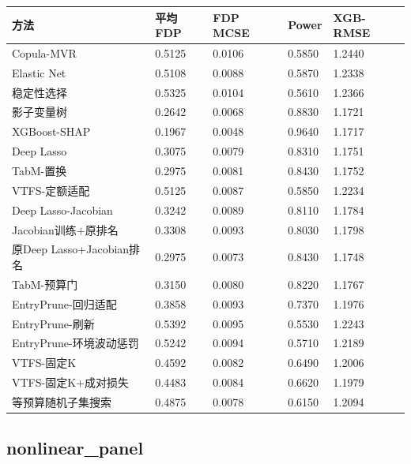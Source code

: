 \documentclass[UTF8,11pt,a4paper]{ctexart}
\begin{document}
{\def\LTcaptype{none} %
{
\footnotesize
\begin{longtable}[]{@{}lllll@{}}
\toprule\noalign{}
方法 & 平均FDP & FDP MCSE & Power & XGB-RMSE \\
\midrule\noalign{}
\endhead
\bottomrule\noalign{}
\endlastfoot
Copula-MVR & 0.5125 & 0.0106 & 0.5850 & 1.2440 \\
Elastic Net & 0.5108 & 0.0088 & 0.5870 & 1.2338 \\
稳定性选择 & 0.5325 & 0.0104 & 0.5610 & 1.2366 \\
影子变量树 & 0.2642 & 0.0068 & 0.8830 & 1.1721 \\
XGBoost-SHAP & 0.1967 & 0.0048 & 0.9640 & 1.1717 \\
Deep Lasso & 0.3075 & 0.0079 & 0.8310 & 1.1751 \\
TabM-置换 & 0.2975 & 0.0081 & 0.8430 & 1.1752 \\
VTFS-定额适配 & 0.5125 & 0.0087 & 0.5850 & 1.2234 \\
Deep Lasso-Jacobian & 0.3242 & 0.0089 & 0.8110 & 1.1784 \\
Jacobian训练+原排名 & 0.3308 & 0.0093 & 0.8030 & 1.1798 \\
原Deep Lasso+Jacobian排名 & 0.2975 & 0.0073 & 0.8430 & 1.1748 \\
TabM-预算门 & 0.3150 & 0.0080 & 0.8220 & 1.1767 \\
EntryPrune-回归适配 & 0.3858 & 0.0093 & 0.7370 & 1.1976 \\
EntryPrune-刷新 & 0.5392 & 0.0095 & 0.5530 & 1.2243 \\
EntryPrune-环境波动惩罚 & 0.5242 & 0.0094 & 0.5710 & 1.2189 \\
VTFS-固定K & 0.4592 & 0.0082 & 0.6490 & 1.2006 \\
VTFS-固定K+成对损失 & 0.4483 & 0.0084 & 0.6620 & 1.1979 \\
等预算随机子集搜索 & 0.4875 & 0.0078 & 0.6150 & 1.2094 \\
\end{longtable}
}
}

\subsection{nonlinear\_panel}\label{nonlinear_panel}
\end{document}
